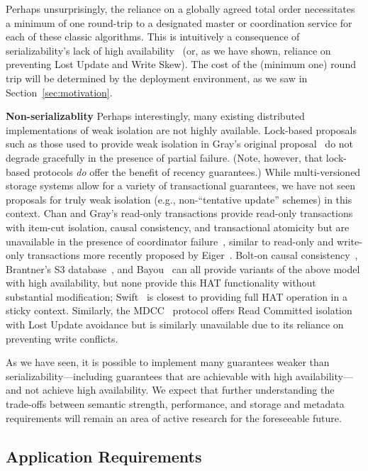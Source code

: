 Perhaps unsurprisingly, the reliance on a globally agreed total order
necessitates a minimum of one round-trip to a designated master or
coordination service for each of these classic algorithms.  This is
intuitively a consequence of serializability's lack of high
availability~\cite{davidson-survey} (or, as we have shown, reliance on
preventing Lost Update and Write Skew).  The cost of the (minimum one)
round trip will be determined by the deployment environment, as we saw
in Section~\ref{sec:motivation}.

\vspace{.5em}\noindent\textbf{Non-serializablity} Perhaps
interestingly, many existing distributed implementations of weak
isolation are not highly available. Lock-based proposals such as those
used to provide weak isolation in Gray's original
proposal~\cite{gray-isolation} do not degrade gracefully in the
presence of partial failure. (Note, however, that lock-based protocols
\textit{do} offer the benefit of recency guarantees.) While
multi-versioned storage systems allow for a variety of transactional
guarantees, we have not seen proposals for truly weak isolation (e.g.,
non-``tentative update'' schemes) in this context. Chan and Gray's
read-only transactions provide read-only transactions with item-cut
isolation, causal consistency, and transactional atomicity but are
unavailable in the presence of coordinator failure~\cite{readonly},
similar to read-only and write-only transactions more recently
proposed by Eiger~\cite{eiger}.  Bolt-on causal
consistency~\cite{bolton}, Brantner's S3 database~\cite{kraska-s3},
and Bayou~\cite{sessionguarantees} can all provide variants of the
above model with high availability, but none provide this HAT
functionality without substantial modification; Swift~\cite{swift} is
closest to providing full HAT operation in a sticky
context. Similarly, the MDCC~\cite{mdcc} protocol offers Read
Committed isolation with Lost Update avoidance but is similarly
unavailable due to its reliance on preventing write conflicts.

As we have seen, it is possible to implement many guarantees weaker
than serializability---including guarantees that are achievable with
high availability---and not achieve high availability. We expect that
further understanding the trade-offs between semantic strength,
performance, and storage and metadata requirements will remain an area
of active research for the foreseeable future.

\subsection{Application Requirements}

